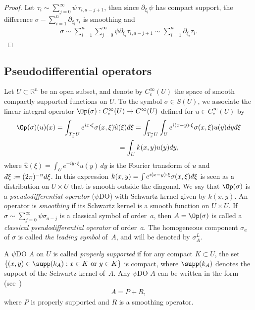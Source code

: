 \documentclass[pdftex]{sigma}
\def\dbar{d{\hskip-1pt\bar{}}\hskip1pt}
\begin{document}
\begin{proof}
Let $\tau_i\sim\sum\limits_{j=0}^\infty\psi\,\tau_{i,a-j+1}$, then since $\partial_{\xi_i}\psi$ has compact support, the dif\/ference $\sigma-\sum\limits_{i=1}^n\partial_{\xi_i}\tau_i$ is smoothing and
\begin{gather*}
\sigma\sim\sum_{i=1}^n\sum_{j=0}^\infty\psi \partial_{\xi_i}\tau_{i,a-j+1}\sim\sum_{i=1}^n\partial_{\xi_i}\tau_i. \tag*{\qed}
\end{gather*}
\renewcommand{\qed}{}
\end{proof}

\subsection{Pseudodif\/ferential operators}

Let $U\subset \mathbb{R}^n$ be an open subset, and denote by $C^{\infty}_c (U)$ the space of smooth compactly supported functions on $U$. To the symbol $\sigma\in S(U)$, we associate the linear integral operator $\Op(\sigma):C^{\infty}_c (U)\to C^{\infty}(U)$ def\/ined for $u\in C^{\infty}_c (U)$ by
\begin{gather*}
\Op(\sigma)(u)(x) =\int_{T_x^*U}{e^{ix\cdot\xi}\sigma(x, \xi)\widehat u(\xi)\dbar\xi}
 =\int_{T_x^*U}{\int_{U}{e^{i(x-y)\cdot\xi}\sigma(x,\xi) u(y) dy\dbar\xi}}\\
\hphantom{\Op(\sigma)(u)(x)}{} =\int_{U}k(x,y)u(y)dy,
\end{gather*}
where $\widehat u(\xi)=\int_{U}{e^{-iy\cdot\xi}u(y)\,dy}$ is the Fourier transform of $u$ and $\dbar\xi:=(2\pi)^{-n}d\xi$.
In this expression $k(x,y)=\int{e^{i(x-y)\cdot\xi}\sigma(x, \xi)\dbar\xi}$ is seen as a distribution on $U\times U$ that is smooth outside the diagonal. We say that $\Op(\sigma)$ is a {\it pseudodifferential operator} ($\psi$DO) with Schwartz kernel given by $k(x,y)$. An operator is \emph{smoothing} if its Schwartz kernel is a smooth function on $U\times U$. If $\sigma\sim \sum\limits_{j=0}^{\infty}\psi\sigma_{a-j}$ is a classical symbol of order~$a$, then $A=\Op(\sigma)$ is called a {\it classical pseudodifferential operator} of order~$a$. The homogeneous component $\sigma_a$ of $\sigma$ is called {\it the leading symbol} of~$A$, and will be denoted by $\sigma^L_A$.

A $\psi$DO $A$ on $U$ is called {\it properly supported} if for any compact $K\subset U$, the set $\{(x,y)\in \supp(k_A): x\in K  \ {\rm or}\ y\in K\}$ is compact, where $\supp(k_A)$ denotes the support of the Schwartz kernel of~$A$.  Any $\psi$DO $A$ can be written in the form (see~\cite{Shubin})
\begin{gather}
A=P+R, \label{eq:PDO}
\end{gather}
where $P$ is properly supported and $R$ is a smoothing operator.
\end{document}
